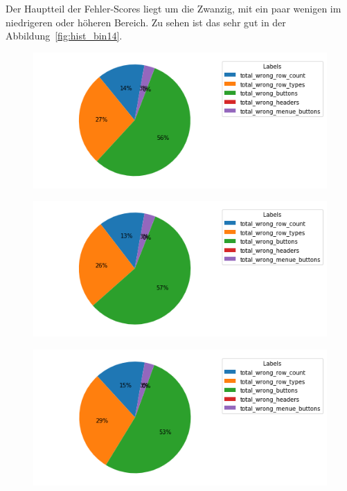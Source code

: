 \documentclass[pdftex,a4paper,halfparskip, article]{scrartcl}
\begin{document}
Der Hauptteil der Fehler-Scores liegt um die Zwanzig, mit ein paar wenigen im niedrigeren oder höheren Bereich. Zu sehen ist das sehr gut in der Abbildung~\ref{fig:hist_bin14}. 

\begin{figure}
\centering
\begin{minipage}{.5\textwidth}
  \centering
  \includegraphics[width=1\linewidth]{predictions_bin14_total_error_types_pie_chart}
  \label{fig:fehler_gesamt_bin14}
\end{minipage}%
\begin{minipage}{.5\textwidth}
  \centering
  \includegraphics[width=1\linewidth]{predictions_bin14_excluded_p80_error_types_pie_chart}
  \label{fig:fehler_beste80_bin14}
\end{minipage}
\begin{minipage}{.5\textwidth}
  \centering
   \includegraphics[width=1\linewidth]{predictions_bin14_p80_error_types_pie_chart}
  \label{fig:fehler_schlechteste20_bin14}
\end{minipage}
\end{figure}
\end{document}
